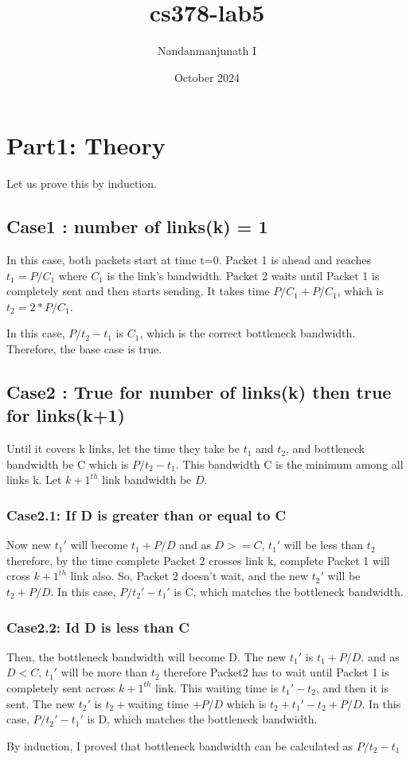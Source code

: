 \documentclass{article}
\title{cs378-lab5}
\author{Nandanmanjunath I}
\date{October 2024}
\begin{document}
\maketitle

\section{Part1: Theory}

Let us prove this by induction.

\subsection{Case1 : number of links(k) = 1}
In this case, both packets start at time t=0. Packet 1 is ahead and reaches $t_1=P/C_1$ where $C_1$ is the link's bandwidth. Packet 2 waits until Packet 1 is completely sent and then starts sending. It takes time $P/C_1+P/C_1$, which is $t_2=2*P/C_1$. 

In this case, $P/t_2-t_1$ is $C_1$, which is the correct bottleneck bandwidth. Therefore, the base case is true.

\subsection{Case2 : True for number  of links(k) then true for links(k+1)}
Until it covers k links, let the time they take be $t_1$ and $t_2$, and bottleneck bandwidth be C which is $P/t_2-t_1$. This bandwidth C is the minimum among all links k. Let  ${k+1}^{th}$ link bandwidth be $D$.
\subsubsection{Case2.1: If D is greater than or equal to C}
Now new $t_1'$ will become $t_1+P/D$ and as $D>=C$, $t_1'$ will be less than $t_2$ therefore, by the time complete Packet 2 crosses link k, complete Packet 1 will cross  ${k+1}^{th}$ link also. So, Packet 2 doesn't wait, and the new $t_2'$ will be $t_2+P/D$. In this case, $P/t_2'-t_1'$ is C, which matches the bottleneck bandwidth.
\subsubsection{Case2.2: Id D is less than C}
Then, the bottleneck bandwidth will become D. The new $t_1'$ is $t_1+P/D$.
and as $D<C$, $t_1'$ will be more than $t_2$ therefore Packet2 has to wait until Packet 1 is completely sent across  ${k+1}^{th}$ link. This waiting time is $t_1'-t_2$, and then it is sent. The new $t_2'$ is $t_2+$waiting time $+P/D$ which is $t_2+t_1'-t_2+P/D$. In this case, $P/t_2'-t_1'$ is D, which matches the bottleneck bandwidth.

By induction, I proved that bottleneck bandwidth can be calculated as $P/t_2-t_1$
\end{document}
